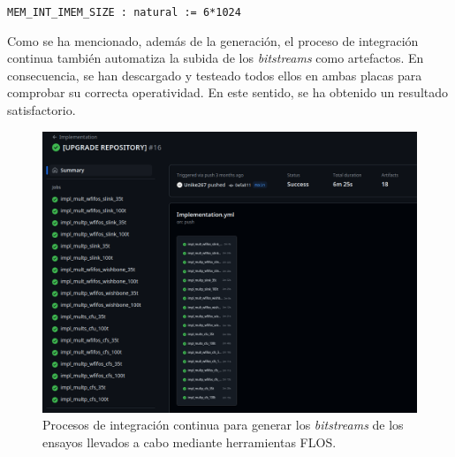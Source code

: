 \hspace{30mm} \texttt{MEM_INT_IMEM_SIZE : natural := 6*1024}

\noindent Como se ha mencionado, además de la generación, el proceso de integración continua también automatiza la subida de los \textit{bitstreams} como artefactos.
En consecuencia, se han descargado y testeado todos ellos en ambas placas para comprobar su correcta operatividad.
En este sentido, se ha obtenido un resultado satisfactorio.

\begin{figure}[H]
    \centering
    \includegraphics[width=14cm]{Figuras/impl-gh.png}
    \caption{Procesos de integración continua para generar los \textit{bitstreams} de los ensayos llevados a cabo mediante herramientas FLOS.}
    \label{fig:impl-gh}
\end{figure}

